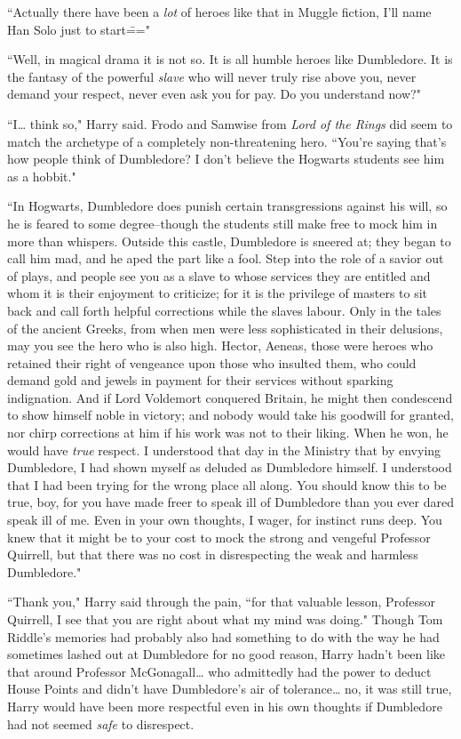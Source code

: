 ``Actually there have been a \emph{lot} of heroes like that in Muggle fiction, I'll name Han Solo just to start\==="

``Well, in magical drama it is not so. It is all humble heroes like Dumbledore. It is the fantasy of the powerful \emph{slave} who will never truly rise above you, never demand your respect, never even ask you for pay. Do you understand now?"

``I{\ldots} think so," Harry said. Frodo and Samwise from \emph{Lord of the Rings} did seem to match the archetype of a completely non-threatening hero. ``You're saying that's how people think of Dumbledore? I don't believe the Hogwarts students see him as a hobbit."

``In Hogwarts, Dumbledore does punish certain transgressions against his will, so he is feared to some degree\---though the students still make free to mock him in more than whispers. Outside this castle, Dumbledore is sneered at; they began to call him mad, and he aped the part like a fool. Step into the role of a savior out of plays, and people see you as a slave to whose services they are entitled and whom it is their enjoyment to criticize; for it is the privilege of masters to sit back and call forth helpful corrections while the slaves labour. Only in the tales of the ancient Greeks, from when men were less sophisticated in their delusions, may you see the hero who is also high. Hector, Aeneas, those were heroes who retained their right of vengeance upon those who insulted them, who could demand gold and jewels in payment for their services without sparking indignation. And if Lord Voldemort conquered Britain, he might then condescend to show himself noble in victory; and nobody would take his goodwill for granted, nor chirp corrections at him if his work was not to their liking. When he won, he would have \emph{true} respect. I understood that day in the Ministry that by envying Dumbledore, I had shown myself as deluded as Dumbledore himself. I understood that I had been trying for the wrong place all along. You should know this to be true, boy, for you have made freer to speak ill of Dumbledore than you ever dared speak ill of me. Even in your own thoughts, I wager, for instinct runs deep. You knew that it might be to your cost to mock the strong and vengeful Professor Quirrell, but that there was no cost in disrespecting the weak and harmless Dumbledore."

``Thank you," Harry said through the pain, ``for that valuable lesson, Professor Quirrell, I see that you are right about what my mind was doing." Though Tom Riddle's memories had probably also had something to do with the way he had sometimes lashed out at Dumbledore for no good reason, Harry hadn't been like that around Professor McGonagall{\ldots} who admittedly had the power to deduct House Points and didn't have Dumbledore's air of tolerance{\ldots} no, it was still true, Harry would have been more respectful even in his own thoughts if Dumbledore had not seemed \emph{safe} to disrespect.

